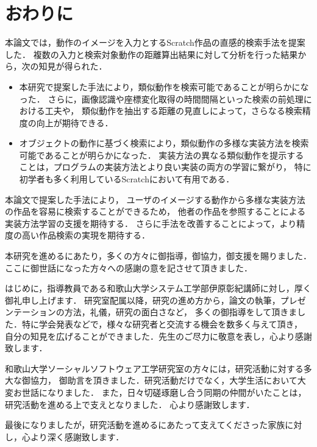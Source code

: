 \documentclass[11pt]{jreport}
\begin{document}
\chapter{おわりに}
本論文では，動作のイメージを入力とするScratch作品の直感的検索手法を提案した．
複数の入力と検索対象動作の距離算出結果に対して分析を行った結果から，次の知見が得られた．

\begin{itemize}
    \item 本研究で提案した手法により，類似動作を検索可能であることが明らかになった．
    さらに，画像認識や座標変化取得の時間間隔といった検索の前処理における工夫や，
    類似動作を抽出する距離の見直しによって，さらなる検索精度の向上が期待できる．
    \item オブジェクトの動作に基づく検索により，類似動作の多様な実装方法を検索可能であることが明らかになった．
    実装方法の異なる類似動作を提示することは，プログラムの実装方法とより良い実装の両方の学習に繋がり，
    特に初学者も多く利用しているScratchにおいて有用である．
\end{itemize}

本論文で提案した手法により，
ユーザのイメージする動作から多様な実装方法の作品を容易に検索することができるため，
他者の作品を参照することによる実装方法学習の支援を期待する．
さらに手法を改善することによって，より精度の高い作品検索の実現を期待する．



 \begin{acknowledgements}
    本研究を進めるにあたり，多くの方々に御指導，御協力，御支援を賜りました．
    ここに御世話になった方々への感謝の意を記させて頂きました．
    
    はじめに，指導教員である和歌山大学システム工学部伊原彰紀講師に対し，厚く御礼申し上げます．
    研究室配属以降，研究の進め方から，論文の執筆，プレゼンテーションの方法，礼儀，研究の面白さなど，
    多くの御指導をして頂きました．特に学会発表などで，様々な研究者と交流する機会を数多く与えて頂き，
    自分の知見を広げることができました．先生のご尽力に敬意を表し，心より感謝致します．
    
    和歌山大学ソーシャルソフトウェア工学研究室の方々には，研究活動に対する多大な御協力，
    御助言を頂きました．研究活動だけでなく，大学生活において大変お世話になりました．
    また，日々切磋琢磨し合う同期の仲間がいたことは，研究活動を進める上で支えとなりました．
    心より感謝致します．
    
    最後になりましたが，研究活動を進めるにあたって支えてくださった家族に対し，心より深く感謝致します．
 \end{acknowledgements}
\end{document}
